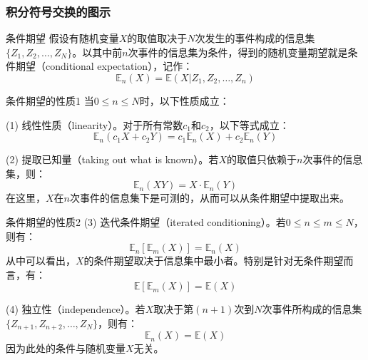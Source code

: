 \documentclass[t]{beamer}
\newcommand{\E}{\mathbb{E}}
\begin{document}
\begin{frame}
  \frametitle{积分符号交换的图示}
  

\end{frame}








\begin{frame}{条件期望}
  假设有随机变量$X$的取值取决于$N$次发生的事件构成的信息集$\{Z_1,Z_2,\ldots,Z_N\}$。以其中前$n$次事件的信息集为条件，得到的随机变量期望就是条件期望（conditional expectation），记作：
\begin{equation*}
\E_n(X)=\E(X|Z_1,Z_2,\ldots,Z_n)
\end{equation*}
\end{frame}

\begin{frame}{条件期望的性质1}
  当$0\le n\le N$时，以下性质成立：

(1) 线性性质（linearity）。对于所有常数$c_1$和$c_2$，以下等式成立：
\[\E_n(c_1 X+c_2 Y)=c_1\E_n(X)+c_2\E_n(Y) \]

(2) 提取已知量（taking out what is known）。若$X$的取值只依赖于$n$次事件的信息集，则：
\[\E_n(XY)=X\cdot \E_n(Y) \]
在这里，$X$在$n$次事件的信息集下是可测的，从而可以从条件期望中提取出来。
\end{frame}

\begin{frame}{条件期望的性质2}
(3) 迭代条件期望（iterated conditioning）。若$0\le n\le m\le N$，则有：
\[\E_n\left[\E_m(X)\right]=\E_n(X) \]
从中可以看出，$X$的条件期望取决于信息集中最小者。特别是针对无条件期望而言，有：
\[\E\left[\E_m(X)\right]=\E(X) \]

(4) 独立性（independence）。若$X$取决于第$(n+1)$次到$N$次事件所构成的信息集$\{Z_{n+1},Z_{n+2},\ldots,Z_N\}$，则有：
\[\E_n(X)=\E(X) \]
因为此处的条件与随机变量$X$无关。
\end{frame}
\end{document}
